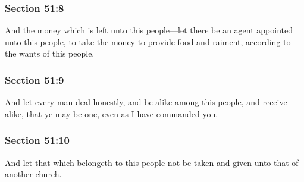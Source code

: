 	\subsubsection{Section 51:8} %
		\label{DC51-8}

		And the money which is left unto this people—let there be an agent appointed unto this people, to take the money to provide food and raiment, according to the wants of this people.


	\subsubsection{Section 51:9} %
		\label{DC51-9}

		And let every man deal honestly, and be alike among this people, and receive alike, that ye may be one, even as I have commanded you.


	\subsubsection{Section 51:10} %
		\label{DC51-10}

		And let that which belongeth to this people not be taken and given unto that of another church.


